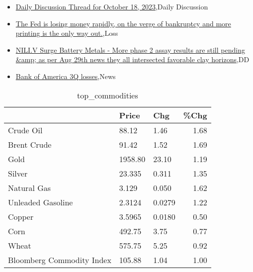 \documentclass{article}%
\begin{document}
%
\begin{itemize}%
\item%
\href{https://reddit.com/r/wallstreetbets/comments/17an0u9/daily\_discussion\_thread\_for\_october\_18\_2023/}{Daily Discussion Thread for October 18, 2023},Daily Discussion%
\item%
\href{https://reddit.com/r/wallstreetbets/comments/17am227/the\_fed\_is\_losing\_money\_rapidly\_on\_the\_verge\_of/}{The Fed is losing money rapidly, on the verge of bankruptcy and more printing is the only way out.},Loss%
\item%
\href{https://reddit.com/r/Baystreetbets/comments/17ac84g/niliv\_surge\_battery\_metals\_more\_phase\_2\_assay/}{NILI.V Surge Battery Metals - More phase 2 assay results are still pending \&amp; as per Aug 29th news they all intersected favorable clay horizons},DD%
\item%
\href{https://reddit.com/r/StockMarket/comments/179zs9l/bank\_of\_america\_3q\_losses/}{Bank of America 3Q losses},News%
\end{itemize}%


\begin{table}[htbp]%
\caption{top\_commodities}%
\centering%
\begin{adjustbox}{width=1\textwidth}%
\begin{tabular}{lllr}
\toprule
                          &   Price &    Chg &  \%Chg \\
\midrule
               Crude Oil  &   88.12 &   1.46 &  1.68 \\
             Brent Crude  &   91.42 &   1.52 &  1.69 \\
                    Gold  & 1958.80 &  23.10 &  1.19 \\
                  Silver  &  23.335 &  0.311 &  1.35 \\
             Natural Gas  &   3.129 &  0.050 &  1.62 \\
       Unleaded Gasoline  &  2.3124 & 0.0279 &  1.22 \\
                  Copper  &  3.5965 & 0.0180 &  0.50 \\
                    Corn  &  492.75 &   3.75 &  0.77 \\
                   Wheat  &  575.75 &   5.25 &  0.92 \\
Bloomberg Commodity Index &  105.88 &   1.04 &  1.00 \\
\bottomrule
\end{tabular}
%
\end{adjustbox}%
\end{table}
\end{document}
